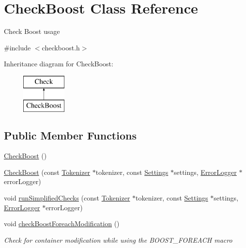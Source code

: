 \hypertarget{class_check_boost}{\section{Check\-Boost Class Reference}
\label{class_check_boost}
}


Check Boost usage  




{\ttfamily \#include $<$checkboost.\-h$>$}

Inheritance diagram for Check\-Boost\-:\begin{figure}[H]
\begin{center}
\leavevmode
\includegraphics[height=2.000000cm]{class_check_boost}
\end{center}
\end{figure}
\subsection*{Public Member Functions}
\begin{DoxyCompactItemize}
\item 
\hyperlink{class_check_boost_ac620572e13404a9bd2454e99fcc63785}{Check\-Boost} ()
\item 
\hyperlink{class_check_boost_a55f2e438b90b2cfff2a6ec192f0d57c7}{Check\-Boost} (const \hyperlink{class_tokenizer}{Tokenizer} $\ast$tokenizer, const \hyperlink{class_settings}{Settings} $\ast$settings, \hyperlink{class_error_logger}{Error\-Logger} $\ast$error\-Logger)
\item 
void \hyperlink{class_check_boost_ad078f45db77a2929504ba36ef5fdb96a}{run\-Simplified\-Checks} (const \hyperlink{class_tokenizer}{Tokenizer} $\ast$tokenizer, const \hyperlink{class_settings}{Settings} $\ast$settings, \hyperlink{class_error_logger}{Error\-Logger} $\ast$error\-Logger)
\item 
void \hyperlink{class_check_boost_a360bd79a6493db25437e8586d54f2036}{check\-Boost\-Foreach\-Modification} ()
\begin{DoxyCompactList}\small\item\em Check for container modification while using the B\-O\-O\-S\-T\-\_\-\-F\-O\-R\-E\-A\-C\-H macro \end{DoxyCompactList}\end{DoxyCompactItemize}
